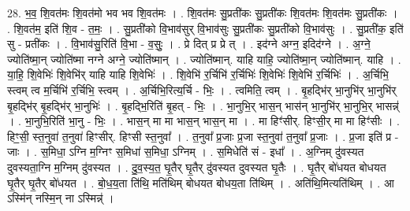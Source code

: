 \documentclass[17pt]{extarticle}
\begin{document}
28. भ॒व॒ शि॒वत॑मः शि॒वत॑मो भव भव शि॒वत॑मः । . शि॒वत॑मः सु॒प्रती॑कः सु॒प्रती॑कः शि॒वत॑मः शि॒वत॑मः सु॒प्रती॑कः । . शि॒वत॑म॒ इति॑ शि॒व - त॒मः॒ । . सु॒प्रती॑को वि॒भाव॑सुर् वि॒भाव॑सुः सु॒प्रती॑कः सु॒प्रती॑को वि॒भाव॑सुः । . सु॒प्रती॑क॒ इति॑ सु - प्रती॑कः । . वि॒भाव॑सु॒रिति॑ वि॒भा - व॒सुः॒ । . प्रे दित् प्र प्रे त् । . इद॑ग्ने अग्न॒ इदिद॑ग्ने । . अ॒ग्ने॒ ज्योति॑ष्मा॒न् ज्योति॑ष्मा नग्ने अग्ने॒ ज्योति॑ष्मान् । . ज्योति॑ष्मान्. याहि याहि॒ ज्योति॑ष्मा॒न् ज्योति॑ष्मान्. याहि । . या॒हि॒ शि॒वेभिः॑ शि॒वेभि॑र् याहि याहि शि॒वेभिः॑ । . शि॒वेभि॑ र॒र्चिभि॑ र॒र्चिभिः॑ शि॒वेभिः॑ शि॒वेभि॑ र॒र्चिभिः॑ । . अ॒र्चिभि॒ स्त्वम् त्व म॒र्चिभि॑ र॒र्चिभि॒ स्त्वम् । . अ॒र्चिभि॒रित्य॒र्चि - भिः॒ । . त्वमिति॒ त्वम् । . बृ॒हद्भि॑र् भा॒नुभि॑र् भा॒नुभि॑र् बृ॒हद्भि॑र् बृ॒हद्भि॑र् भा॒नुभिः॑ । . बृ॒हद्भि॒रिति॑ बृ॒हत् - भिः॒ । . भा॒नुभि॒र् भास॒न् भास॑न् भा॒नुभि॑र् भा॒नुभि॒र् भासन्न्॑ । . भा॒नुभि॒रिति॑ भा॒नु - भिः॒ । . भास॒न् मा मा भास॒न् भास॒न् मा । . मा हिꣳ॑सीर्. हिꣳसी॒र् मा मा हिꣳ॑सीः । . हिꣳ॒॒सी॒ स्त॒नुवा॑ त॒नुवा॑ हिꣳसीर्. हिꣳसी स्त॒नुवा᳚ । . त॒नुवा᳚ प्र॒जाः प्र॒जा स्त॒नुवा॑ त॒नुवा᳚ प्र॒जाः । . प्र॒जा इति॑ प्र - जाः । . स॒मिधा॒ ऽग्नि म॒ग्निꣳ स॒मिधा॑ स॒मिधा॒ ऽग्निम् । . स॒मिधेति॑ सं - इधा᳚ । . अ॒ग्निम् दु॑वस्यत दुवस्यता॒ग्नि म॒ग्निम् दु॑वस्यत । . दु॒व॒स्य॒त॒ घृ॒तैर् घृ॒तैर् दु॑वस्यत दुवस्यत घृ॒तैः । . घृ॒तैर् बो॑धयत बोधयत घृ॒तैर् घृ॒तैर् बो॑धयत । . बो॒ध॒य॒ता ति॑थि॒ मति॑थिम् बोधयत बोधय॒ता ति॑थिम् । . अति॑थि॒मित्यति॑थिम् । . आ ऽस्मि॑न् नस्मि॒न् ना ऽस्मिन्न्॑ । \newline
\end{document}
